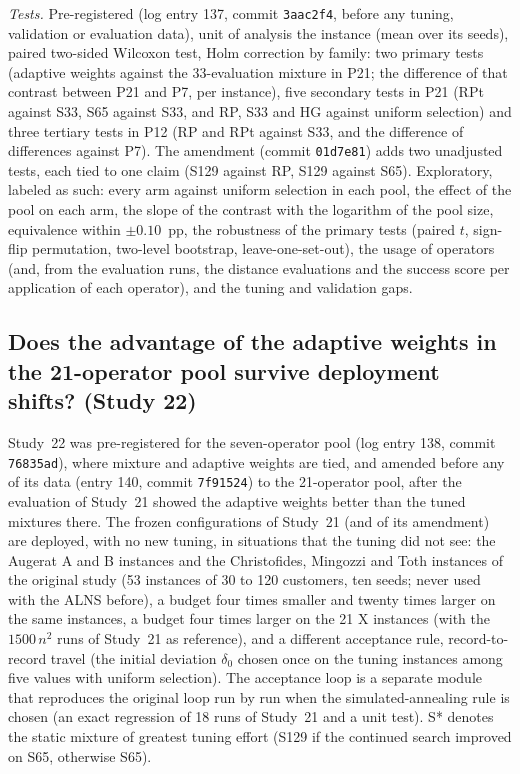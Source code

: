 \emph{Tests.} Pre-registered (log entry 137, commit \texttt{3aac2f4}, before any tuning, validation or evaluation data), unit of analysis the instance (mean over its seeds), paired two-sided Wilcoxon test, Holm correction by family: two primary tests (adaptive weights against the 33-evaluation mixture in P21; the difference of that contrast between P21 and P7, per instance), five secondary tests in P21 (RPt against S33, S65 against S33, and RP, S33 and HG against uniform selection) and three tertiary tests in P12 (RP and RPt against S33, and the difference of differences against P7). The amendment (commit \texttt{01d7e81}) adds two unadjusted tests, each tied to one claim (S129 against RP, S129 against S65). Exploratory, labeled as such: every arm against uniform selection in each pool, the effect of the pool on each arm, the slope of the contrast with the logarithm of the pool size, equivalence within $\pm0.10$~pp, the robustness of the primary tests (paired $t$, sign-flip permutation, two-level bootstrap, leave-one-set-out), the usage of operators (and, from the evaluation runs, the distance evaluations and the success score per application of each operator), and the tuning and validation gaps.

\subsection{Does the advantage of the adaptive weights in the 21-operator pool survive deployment shifts? (Study 22)}\label{sec:s22design}
Study~22 was pre-registered for the seven-operator pool (log entry 138, commit \texttt{76835ad}), where mixture and adaptive weights are tied, and amended before any of its data (entry 140, commit \texttt{7f91524}) to the 21-operator pool, after the evaluation of Study~21 showed the adaptive weights better than the tuned mixtures there. The frozen configurations of Study~21 (and of its amendment) are deployed, with no new tuning, in situations that the tuning did not see: the Augerat A and B instances and the Christofides, Mingozzi and Toth instances of the original study (53 instances of 30 to 120 customers, ten seeds; never used with the ALNS before), a budget four times smaller and twenty times larger on the same instances, a budget four times larger on the 21 X instances (with the $1500\,n^2$ runs of Study~21 as reference), and a different acceptance rule, record-to-record travel (the initial deviation $\delta_0$ chosen once on the tuning instances among five values with uniform selection). The acceptance loop is a separate module that reproduces the original loop run by run when the simulated-annealing rule is chosen (an exact regression of 18 runs of Study~21 and a unit test). S* denotes the static mixture of greatest tuning effort (S129 if the continued search improved on S65, otherwise S65).

